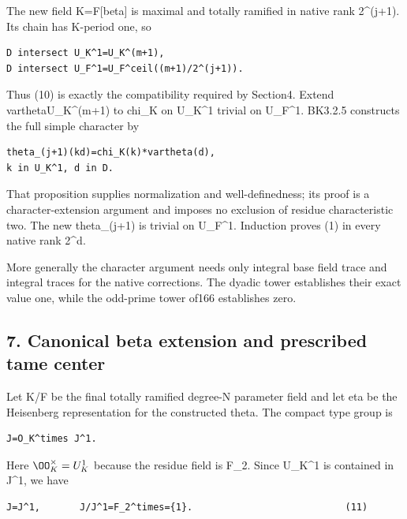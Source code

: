The new field K=F{[}beta{]} is maximal and totally ramified in native
rank 2\^{}(j+1). Its chain has K-period one, so

\begin{Verbatim}[fontsize=\small,breaklines=true,breakanywhere=true]
D intersect U_K^1=U_K^(m+1),
D intersect U_F^1=U_F^ceil((m+1)/2^(j+1)).
\end{Verbatim}

Thus (10) is exactly the compatibility required by Section4. Extend
vartheta\textbar U\_K\^{}(m+1) to chi\_K on U\_K\^{}1 trivial on
U\_F\^{}1. BK3.2.5 constructs the full simple character by

\begin{Verbatim}[fontsize=\small,breaklines=true,breakanywhere=true]
theta_(j+1)(kd)=chi_K(k)*vartheta(d),
k in U_K^1, d in D.
\end{Verbatim}

That proposition supplies normalization and well-definedness; its proof
is a character-extension argument and imposes no exclusion of residue
characteristic two. The new theta\_(j+1) is trivial on U\_F\^{}1.
Induction proves (1) in every native rank 2\^{}d.

More generally the character argument needs only integral base field
trace and integral traces for the native corrections. The dyadic tower
establishes their exact value one, while the odd-prime tower of166
establishes zero.

\hypertarget{dyadic_character-canonical-beta-extension-and-prescribed-tame-center}{%
\subsection{7. Canonical beta extension and prescribed tame
center}\label{dyadic_character-canonical-beta-extension-and-prescribed-tame-center}}

Let K/F be the final totally ramified degree-N parameter field and let
eta be the Heisenberg representation for the constructed theta. The
compact type group is

\begin{Verbatim}[fontsize=\small,breaklines=true,breakanywhere=true]
J=O_K^times J^1.
\end{Verbatim}

Here \(\OO_K^\times=U_K^1\) because the residue field is
F\_2. Since U\_K\^{}1 is contained in J\^{}1, we have

\begin{Verbatim}[fontsize=\small,breaklines=true,breakanywhere=true]
J=J^1,       J/J^1=F_2^times={1}.                           (11)
\end{Verbatim}

